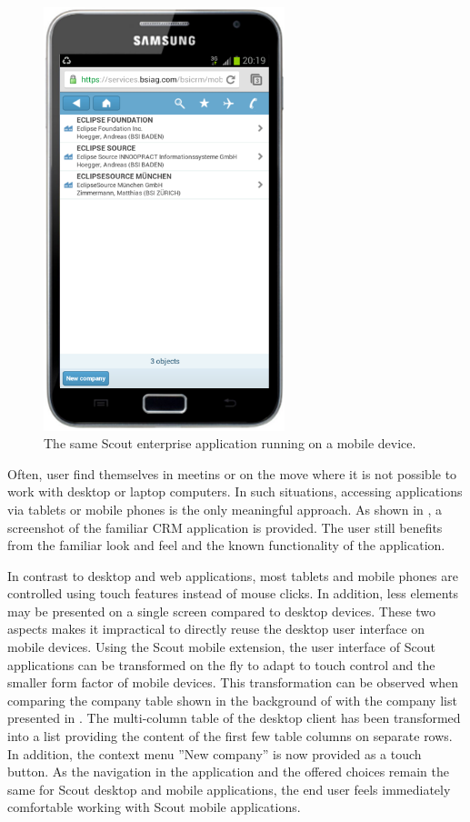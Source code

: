 \documentclass[a4paper,10pt,twoside]{book}
\begin{document}
\begin{figure}
\includegraphics[width=7cm]{bsi_crm_mobile_galaxy.png}
\caption{The same Scout enterprise application running on a mobile device.}
\end{figure}

Often, user find themselves in meetins or on the move where it is not possible to work with desktop or laptop computers.
In such situations, accessing applications via tablets or mobile phones is the only meaningful approach.
As shown in , a screenshot of the familiar CRM application is provided.
The user still benefits from the familiar look and feel and the known functionality of the application.

In contrast to desktop and web applications, most tablets and mobile phones are controlled using touch features instead of mouse clicks.
In addition, less elements may be presented on a single screen compared to desktop devices.
These two aspects makes it impractical to directly reuse the desktop user interface on mobile devices.
Using the Scout mobile extension, the user interface of Scout applications can be transformed on the fly to adapt to touch control and the smaller form factor of mobile devices.
This transformation can be observed when comparing the company table shown in the background of  with the company list presented in .
The multi-column table of the desktop client has been transformed into a list providing the content of the first few table columns on separate rows.
In addition, the context menu ''New company'' is now provided as a touch button.
As the navigation in the application and the offered choices remain the same for Scout desktop and mobile applications, the end user feels immediately comfortable working with Scout mobile applications.
\end{document}
